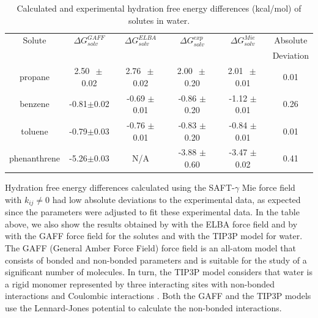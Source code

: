 \begin{table}[H]
  \centering
  \caption{Calculated and experimental hydration free energy differences  (kcal/mol) of solutes in water.}
  \label{tbl:solv2}
  \begin{tabular}{cccccc}
  	\hline\hline
  	Solute       & $\Delta G_{solv}^{GAFF}$ & $\Delta G_{solv}^{ELBA}$ & $\Delta G_{solv}^{exp}$ & $\Delta G_{solv}^{Mie}$ & Absolute  \\
  	             &                          &                          &                         &                         & Deviation \\ \hline\hline
  	propane      & 2.50 $\, \pm$0.02           & 2.76 $\, \pm$ 0.02          & 2.00 $\, \pm$ 0.20         & 2.01 $ \, \pm$ 0.01         & 0.01      \\
  	benzene      & -0.81$\pm$0.02           & -0.69 $\pm$ 0.01         & -0.86 $\pm$ 0.20        & -1.12 $\pm$ 0.01        & 0.26      \\
  	toluene      & -0.79$\pm$0.03           & -0.76 $\pm$ 0.01         & -0.83 $\pm$ 0.20        & -0.84 $\pm$ 0.01        & 0.01      \\
  	phenanthrene & -5.26$\pm$0.03           & N/A                        & -3.88 $\pm$ 0.60        & -3.47 $\pm$ 0.02        & 0.41      \\ \hline\hline
  \end{tabular}

\end{table}

Hydration free energy differences calculated using the SAFT-$\gamma$ Mie force field with $k_{ij} \neq 0$ had low absolute deviations to the experimental data, as expected since the parameters were adjusted to fit these experimental data. In the table above, we also show the results obtained by  with the ELBA force field and by  with the GAFF force field for the solutes and with the TIP3P model for water. The GAFF (General Amber Force Field) force field is an all-atom model that consists of bonded and non-bonded parameters and is suitable for the study of a significant number of molecules. In turn, the TIP3P model considers that water is a rigid monomer represented by three interacting sites with non-bonded interactions and Coulombic interactions \cite{doi:10.1063/1.445869}. Both the GAFF and the TIP3P models use the Lennard-Jones potential to calculate the non-bonded interactions.

